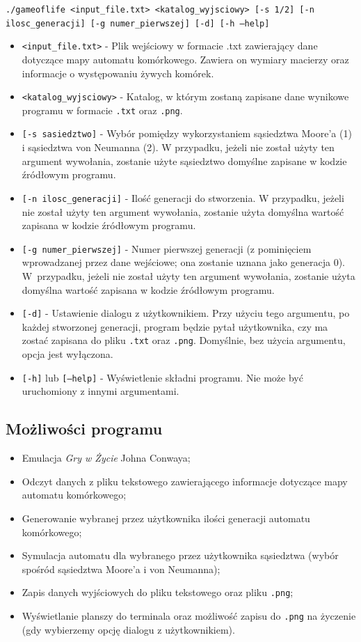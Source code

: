 \documentclass[a4paper,12pt]{article}
\begin{document}
\texttt{./gameoflife <input\_file.txt> <katalog\_wyjsciowy> [-s 1/2] [-n \\ilosc\_generacji] [-g numer\_pierwszej] [-d] [-h --help]}
\begin{itemize}
	\item	\texttt{<input\_file.txt>} - Plik wejściowy w formacie .txt zawierający dane dotyczące mapy automatu komórkowego. Zawiera on wymiary macierzy oraz informacje o występowaniu żywych komórek.
    \item	\texttt{<katalog\_wyjsciowy>} - Katalog, w którym zostaną zapisane dane wynikowe programu w formacie \texttt{.txt} oraz \texttt{.png}.
    \item	\texttt{[-s sasiedztwo]} - Wybór pomiędzy wykorzystaniem sąsiedztwa Moore'a (1) i sąsiedztwa von Neumanna (2). W przypadku, jeżeli nie został użyty ten argument wywołania, zostanie użyte sąsiedztwo domyślne zapisane w kodzie źródłowym programu.
    \item	\texttt{[-n ilosc\_generacji]} - Ilość generacji do stworzenia. W przypadku, jeżeli nie został użyty ten argument wywołania, zostanie użyta domyślna wartość zapisana w kodzie źródłowym programu.
    \item	\texttt{[-g numer\_pierwszej]} - Numer pierwszej generacji (z pominięciem wprowadzanej przez dane wejściowe; ona zostanie uznana jako generacja 0). W~przypadku, jeżeli nie został użyty ten argument wywołania, zostanie użyta domyślna wartość zapisana w kodzie źródłowym programu.
    \item	\texttt{[-d]} - Ustawienie dialogu z użytkownikiem. Przy użyciu tego argumentu, po każdej stworzonej generacji, program będzie pytał użytkownika, czy ma zostać zapisana do pliku \texttt{.txt} oraz \texttt{.png}. Domyślnie, bez użycia argumentu, opcja jest wyłączona.
    \item 	\texttt{[-h]} lub \texttt{[--help]} - Wyświetlenie składni programu. Nie może być uruchomiony z innymi argumentami.
\end{itemize}

\subsection{Możliwości programu}
\begin{itemize}
\item Emulacja \textit{Gry w Życie} Johna Conwaya;
\item Odczyt danych z pliku tekstowego zawierającego informacje dotyczące mapy automatu komórkowego;
\item Generowanie wybranej przez użytkownika ilości generacji automatu komórkowego;
\item Symulacja automatu dla wybranego przez użytkownika sąsiedztwa (wybór spośród sąsiedztwa Moore'a i von Neumanna);
\item Zapis danych wyjściowych do pliku tekstowego oraz pliku \texttt{.png};
\item Wyświetlanie planszy do terminala oraz  możliwość zapisu do \texttt{.png} na życzenie (gdy wybierzemy opcję dialogu z użytkownikiem).
\end{itemize}
\end{document}
